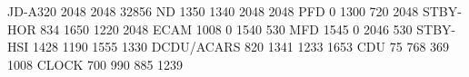 JD-A320 2048 2048 32856
ND          1350 1340 2048 2048
PFD            0 1300  720 2048
STBY-HOR     834 1650 1220 2048
ECAM        1008    0 1540  530
MFD         1545    0 2046  530
STBY-HSI    1428 1190 1555 1330
DCDU/ACARS   820 1341 1233 1653
CDU           75  768  369 1008
CLOCK        700  990  885 1239 
